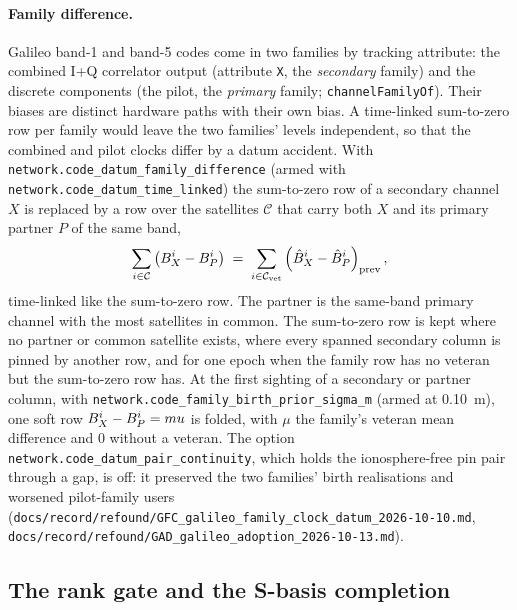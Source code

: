 \documentclass[main.tex]{subfiles}
\begin{document}
\paragraph{Family difference.}
Galileo band-1 and band-5 codes come in two families by tracking
attribute: the combined I+Q correlator output (attribute \texttt{X}, the
\emph{secondary} family) and the discrete components (the pilot,
the \emph{primary} family; \texttt{channelFamilyOf}). Their biases are
distinct hardware paths with their own bias. A time-linked sum-to-zero
row per family would leave the two families' levels independent, so
that the combined and pilot clocks differ by a datum accident.
With \texttt{network.code\_datum\_family\_difference} (armed with
\texttt{network.code\_datum\_time\_linked}) the sum-to-zero row of a
secondary channel $X$ is replaced by a row over the satellites
$\mathcal{C}$ that carry both $X$ and its primary partner $P$ of the same
band,
\begin{equation}
\sum_{i\in\mathcal{C}}
   \left(B^i_{X} - B^i_{P}\right)
\;=\; \sum_{i\in\mathcal{C}_{\text{vet}}}
   \left(\hat{B}^i_{X} - \hat{B}^i_{P}\right)_{\text{prev}},
\label{eq:net-cb-family}
\end{equation}
time-linked like the sum-to-zero row. The partner is the same-band
primary channel with the most satellites in common. The sum-to-zero row
is kept where no partner or common satellite exists, where every
spanned secondary column is pinned by another row, and for one epoch
when the family row has no veteran but the sum-to-zero row has. At the
first sighting of a secondary or partner column, with
\texttt{network.code\_family\_birth\_prior\_sigma\_m} (armed at
\SI{0.10}{\metre}), one soft row
$B^i_X - B^i_P = mu$ is folded, with $\mu$ the
family's veteran mean difference and $0$ without a veteran. The
option \texttt{network.code\_datum\_pair\_continuity}, which holds the
ionosphere-free pin pair through a gap, is off: it preserved the two
families' birth realisations and worsened pilot-family users
(\texttt{docs/record/refound/GFC\_galileo\_family\_clock\_datum\_2026-10-10.md},
\texttt{docs/record/refound/GAD\_galileo\_adoption\_2026-10-13.md}).

\subsection{The rank gate and the S-basis completion}\label{sec:net-rankgate}
\end{document}
